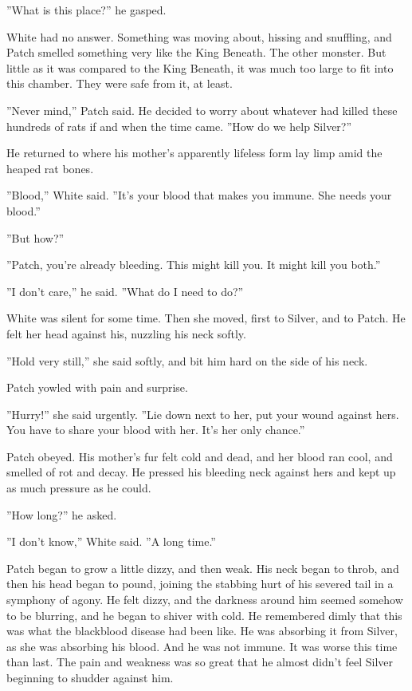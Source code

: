 \documentclass[12pt]{book}
\begin{document}
''What is this place?'' he gasped.

White had no answer. Something was moving about, hissing and snuffling, and Patch smelled something very like the King Beneath. The other monster. But little as it was compared to the King Beneath, it was much too large to fit into this chamber. They were safe %
from it, at least. 

''Never mind,'' Patch said. He decided to worry about whatever had killed these hundreds of rats if and when the time came. ''How do we help Silver?''

He returned to where his mother's apparently lifeless form lay limp amid the heaped rat bones.

''Blood,'' White said. ''It's your blood that makes you immune. She needs your blood.''

''But %
how?''

''Patch, you're already bleeding. This might kill you. It might kill you both.''

''I don't care,'' he said. ''What do I need to do?''

White was silent for some time. Then she moved, first to Silver, and to Patch. He felt her head against his, nuzzling his neck softly.

''Hold very still,'' she said softly, and bit him hard on the side of his neck.

Patch yowled with pain and surprise.

''Hurry!'' she said urgently. ''Lie down next to her, put your wound against hers. You have to share your blood with her. It's her only chance.''

Patch obeyed. His mother's fur felt cold and dead, and her blood ran cool, and smelled of rot and decay. He pressed his bleeding neck against hers and kept up as much pressure as he could.

''How long?'' he asked.

''I don't know,'' White said. ''A long time.''

Patch began to grow a little dizzy, and then weak. His neck began to throb, and then his head began to pound, joining the stabbing hurt of his severed tail in a symphony of agony. He felt dizzy, and the darkness around him seemed somehow to be blurring, and he began to shiver with cold. He remembered dimly that this was what the blackblood disease had been like. He was absorbing it from Silver, as she was absorbing his blood. And he was not immune. It was worse this time than last. The pain and weakness was so great that he almost didn't feel Silver beginning to shudder against him.
\end{document}
